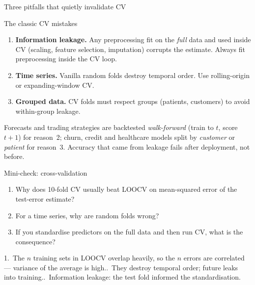 \documentclass[aspectratio=169,11pt]{beamer}
\begin{document}
\begin{frame}{Three pitfalls that quietly invalidate CV}
  \begin{alertblock}{The classic CV mistakes}
    \begin{enumerate}
      \item \textbf{Information leakage.} Any preprocessing fit on the
            \emph{full} data and used inside CV (scaling, feature
            selection, imputation) corrupts the estimate. Always fit
            preprocessing inside the CV loop.
      \item \textbf{Time series.} Vanilla random folds destroy
            temporal order. Use rolling-origin or expanding-window CV.
      \item \textbf{Grouped data.} CV folds must respect groups
            (patients, customers) to avoid within-group leakage.
    \end{enumerate}
  \end{alertblock}
  \begin{industry}
    Forecasts and trading strategies are backtested \emph{walk-forward}
    (train to $t$, score $t+1$) for reason~2; churn, credit and healthcare
    models split by \emph{customer} or \emph{patient} for reason~3.
    Accuracy that came from leakage fails after deployment, not before.
  \end{industry}
\end{frame}


\begin{frame}{Mini-check: cross-validation}
  \begin{readme}
    \begin{enumerate}
      \item Why does 10-fold CV usually beat LOOCV on mean-squared error
            of the test-error estimate?
      \item For a time series, why are random folds wrong?
      \item If you standardise predictors on the full data and then run
            CV, what is the consequence?
    \end{enumerate}
  \end{readme}
  \begin{takeaway}[Answers]
    1.\ The $n$ training sets in LOOCV overlap heavily, so the $n$ errors
        are correlated --- variance of the average is high..\ They destroy temporal order; future leaks into training..\ Information leakage: the test fold informed the standardisation.
  \end{takeaway}
\end{frame}
\end{document}
